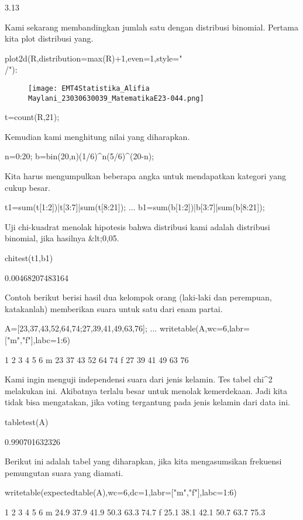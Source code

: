 \documentclass{article}
\begin{document}
    3.13

Kami sekarang membandingkan jumlah satu dengan distribusi binomial.
Pertama kita plot distribusi yang.


\>plot2d(R,distribution=max(R)+1,even=1,style="\\/"):


\begin{figure}
    \centering
    \texttt{[image: EMT4Statistika\_Alifia Maylani\_23030630039\_MatematikaE23-044.png]}
    \caption{}
    \label{fig:enter-label}
\end{figure}

\>t=count(R,21);


Kemudian kami menghitung nilai yang diharapkan.


\>n=0:20; b=bin(20,n)\*(1/6)^n\*(5/6)^(20-n);


Kita harus mengumpulkan beberapa angka untuk mendapatkan kategori yang
cukup besar.


\>t1=sum(t[1:2])|t[3:7]|sum(t[8:21]); ...  
\>   b1=sum(b[1:2])|b[3:7]|sum(b[8:21]);


Uji chi-kuadrat menolak hipotesis bahwa distribusi kami adalah
distribusi binomial, jika hasilnya &lt;0,05.


\>chitest(t1,b1)


    0.00468207483164

Contoh berikut berisi hasil dua kelompok orang (laki-laki dan
perempuan, katakanlah) memberikan suara untuk satu dari enam partai.


\>A=[23,37,43,52,64,74;27,39,41,49,63,76];  ...  
\>     writetable(A,wc=6,labr=["m","f"],labc=1:6)


               1     2     3     4     5     6
         m    23    37    43    52    64    74
         f    27    39    41    49    63    76

Kami ingin menguji independensi suara dari jenis kelamin. Tes tabel
chi^2 melakukan ini. Akibatnya terlalu besar untuk menolak
kemerdekaan. Jadi kita tidak bisa mengatakan, jika voting tergantung
pada jenis kelamin dari data ini.


\>tabletest(A)


    0.990701632326

Berikut ini adalah tabel yang diharapkan, jika kita mengasumsikan
frekuensi pemungutan suara yang diamati.


\>writetable(expectedtable(A),wc=6,dc=1,labr=["m","f"],labc=1:6)


               1     2     3     4     5     6
         m  24.9  37.9  41.9  50.3  63.3  74.7
         f  25.1  38.1  42.1  50.7  63.7  75.3
\end{document}
